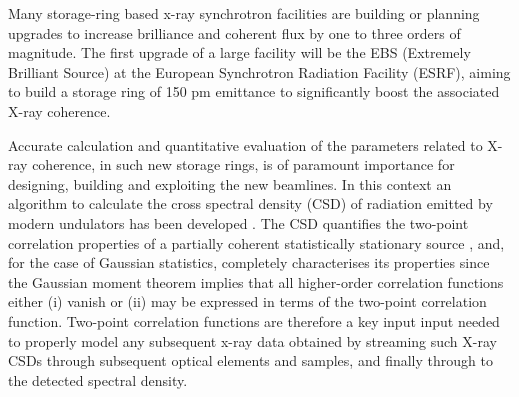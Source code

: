 \documentclass{iucr}              %
\begin{document}
Many storage-ring based x-ray synchrotron facilities are building or planning upgrades to increase brilliance and coherent flux by one to three orders of magnitude.  The first upgrade of a large facility will be the EBS (Extremely Brilliant Source) \cite{orangebook} at the European Synchrotron Radiation Facility (ESRF), aiming to build a storage ring of 150 pm emittance to significantly boost the associated X-ray coherence.

Accurate calculation and quantitative evaluation of the parameters related to X-ray coherence, in such new storage rings, is of paramount importance for designing, building and exploiting the new beamlines. In this context an algorithm to calculate the cross spectral density (CSD) of radiation emitted by modern undulators has been developed \cite{glass}.  The CSD quantifies the two-point correlation properties of a partially coherent statistically stationary source \cite{Wolf1982,mandel_wolf}, and, for the case of Gaussian statistics, completely characterises its properties {\color{blue} since the Gaussian moment theorem implies that all higher-order correlation functions either (i) vanish or (ii) may be expressed in terms of the two-point correlation function}.  Two-point correlation functions are therefore a key input input needed to properly model any subsequent x-ray data obtained by streaming such X-ray CSDs through subsequent optical elements and samples, and finally through to the detected spectral density.  
\end{document}

